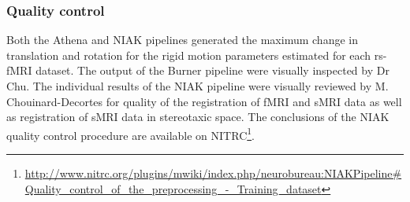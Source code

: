 \documentclass[preprint,12pt,3p]{elsarticle}
\begin{document}

\subsubsection{Quality control}

Both the Athena and NIAK pipelines generated the maximum change in translation and rotation for the rigid motion parameters estimated for each rs-fMRI dataset. The output of the Burner pipeline were visually inspected by Dr Chu. The individual results of the NIAK pipeline were visually reviewed by M. Chouinard-Decortes for quality of the registration of fMRI and sMRI data as well as registration of sMRI data in stereotaxic space. The conclusions of the NIAK quality control procedure are available on NITRC\footnote{\url{http://www.nitrc.org/plugins/mwiki/index.php/neurobureau:NIAKPipeline#Quality_control_of_the_preprocessing_-_Training_dataset}}.


\end{document}
